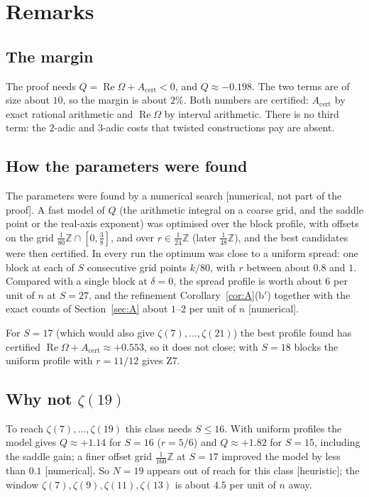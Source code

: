 \documentclass[11pt]{amsart}
\theoremstyle{definition}
\theoremstyle{remark}
\numberwithin{equation}{section}
\newcommand{\ZZ}{\mathbb{Z}}
\newcommand{\Acert}{A_{\mathrm{cert}}}
\renewcommand{\Re}{\operatorname{Re}}
\begin{document}
\section{Remarks}\label{sec:remarks}

\subsection{The margin}
The proof needs $Q=\Re\Omega+\Acert<0$, and $Q\approx-0.198$. The two terms are of size about $10$, so the margin is
about $2\%$. Both numbers are certified: $\Acert$ by exact rational arithmetic and $\Re\Omega$ by interval arithmetic.
There is no third term: the $2$-adic and $3$-adic costs that twisted constructions pay are absent.

\subsection{How the parameters were found}\label{sec:search}
The parameters were found by a numerical search [numerical, not part of the proof]. A fast model of $Q$ (the
arithmetic integral on a coarse grid, and the saddle point or the real-axis exponent) was optimised over the block
profile, with offsets on the grid $\frac1{80}\ZZ\cap[0,\frac38]$, and over $r\in\frac1{24}\ZZ$ (later
$\frac1{48}\ZZ$), and the best candidates were then certified. In every run the optimum was close to a uniform
spread: one block at each of $S$ consecutive grid points $k/80$, with $r$ between about $0.8$ and $1$. Compared with
a single block at $\delta=0$, the spread profile is worth about $6$ per unit of $n$ at $S=27$, and the refinement
Corollary~\ref{cor:A}(b$'$) together with the exact counts of Section~\ref{sec:A} about $1$--$2$ per unit of $n$
[numerical].

For $S=17$ (which would also give $\zeta(7),\dots,\zeta(21)$) the best profile found has certified
$\Re\Omega+\Acert\approx+0.553$, so it does not close; with $S=18$ blocks the uniform profile with $r=11/12$ gives
Z7.

\subsection{\texorpdfstring{Why not $\zeta(19)$}{Why not zeta(19)}}\label{sec:N19}
To reach $\zeta(7),\dots,\zeta(19)$ this class needs $S\le16$. With uniform profiles the model gives $Q\approx+1.14$
for $S=16$ ($r=5/6$) and $Q\approx+1.82$ for $S=15$, including the saddle gain; a finer offset grid $\frac1{160}\ZZ$
at $S=17$ improved the model by less than $0.1$ [numerical]. So $N=19$ appears out of reach for this class
[heuristic]; the window $\zeta(7),\zeta(9),\zeta(11),\zeta(13)$ is about $4.5$ per unit of $n$ away.
\end{document}
